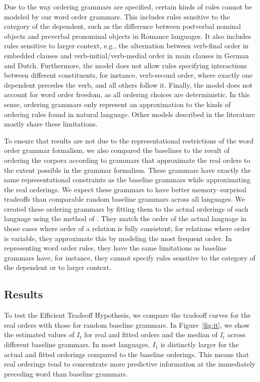 Due to the way ordering grammars are specified, certain kinds of rules cannot be modeled by our word order grammars.
This includes rules sensitive to the category of the dependent, such as the difference between postverbal nominal objects and preverbal pronominal objects in Romance languages.
It also includes rules sensitive to larger context, e.g., the alternation between verb-final order in embedded clauses and verb-initial/verb-medial order in main clauses in German and Dutch.
Furthermore, the model does not allow rules specifying interactions between different constituents, for instance, verb-second order, where exactly one dependent precedes the verb, and all others follow it.
Finally, the model does not account for word order freedom, as all ordering choices are deterministic.
In this sense, ordering grammars only represent an approximation to the kinds of ordering rules found in natural language.
Other models described in the literature \citep{futrell2015experiments, wang2016galactic} mostly share these limitations.


To ensure that results are not due to the representational restrictions of the word order grammar formalism, we also compared the baselines to the result of ordering the corpora according to grammars that approximate the real orders to the extent possible in the grammar formalism.
These grammars have exactly the same representational constraints as the baseline grammars while approximating the real orderings.
We expect these grammars to have better memory--surprisal tradeoffs than comparable random baseline grammars across all languages.
We created these ordering grammars by fitting them to the actual orderings of each language using the method of \cite{hahn2020universals}.
They match the order of the actual language in those cases where order of a relation is fully consistent; for relations where order is variable, they approximate this by modeling the most frequent order.
In representing word order rules, they have the same limitations as baseline grammars have, for instance, they cannot specify rules sensitive to the category of the dependent or to larger context.


\subsection{Results}\label{sec:main-experiment-results}
To test the Efficient Tradeoff Hypothesis, we compare the tradeoff curves for the real orders with those for random baseline grammars.
In Figure~\ref{fig:it}, we show the estimated values of $I_t$ for real and fitted orders and the median of $I_t$ across different baseline grammars.
In most languages, $I_1$ is distinctly larger for the actual and fitted orderings compared to the baseline orderings. This means that real orderings tend to concentrate more predictive information at the immediately preceding word than baseline grammars.

